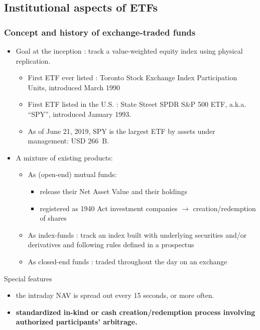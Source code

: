 \documentclass[handout, 9pt, usenames, dvipsnames]{beamer}
\begin{document}
\subsection{Institutional aspects of ETFs}

\begin{frame}
  \frametitle{Concept and history of exchange-traded funds}
  \begin{itemize}
  \item<1-> Goal at the inception : track a value-weighted equity index using physical replication.
    \begin{itemize}
    \item First ETF ever listed : Toronto Stock Exchange Index Participation Units, introduced March 1990
    \item First ETF listed in the U.S. : State Street SPDR S\&P 500 ETF, a.k.a. ``SPY'', introduced January 1993.
    \item As of June 21, 2019, SPY is the largest ETF by assets under management: USD 266~B.
    \end{itemize}
  \item<2-> A mixture of existing products:
    \begin{itemize}
    \item As (open-end) mutual funds:
      \begin{itemize}
      \item release their Net Asset Value and their holdings
      \item registered as 1940 Act investment companies $\rightarrow$ creation/redemption of shares
      \end{itemize}
    \item As index-funds : track an index built with underlying
      securities and/or derivatives and following rules defined in a
      prospectus
    \item As closed-end funds : traded throughout the day on an
      exchange
    \end{itemize}
  \end{itemize}
  \begin{alertblock}{Special features}
    \begin{itemize}
    \item the intraday NAV is spread out every 15 seconds, or more often.
    \item \textbf{standardized in-kind or cash creation/redemption process involving authorized participants' arbitrage.}
    \end{itemize}
  \end{alertblock}
\end{frame}
\end{document}
